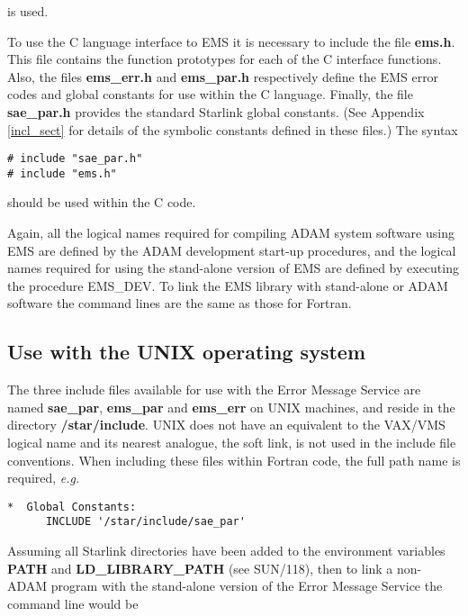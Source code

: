 is used.

To use the C language interface to EMS it is necessary to include the file
{\bf ems.h}.
This file contains the function prototypes for each of the C interface
functions.
Also, the files {\bf ems\_err.h} and {\bf ems\_par.h} respectively define the 
EMS error codes and global constants for use within the C language.
Finally, the file {\bf sae\_par.h} provides the standard Starlink global 
constants.
(See Appendix \ref{incl_sect} for details of the symbolic constants defined in
these files.)
The syntax

\begin{verbatim}
# include "sae_par.h"
# include "ems.h"
\end{verbatim}

should be used within the C code.

Again, all the logical names required for compiling ADAM system software using
EMS are defined by the ADAM development start-up procedures, and the logical
names required for using the stand-alone version of EMS are defined by
executing the procedure EMS\_DEV.
To link the EMS library with stand-alone or ADAM software the command lines
are the same as those for Fortran.


\subsection {Use with the UNIX operating system}

The three include files available for use with the Error Message Service
are named {\bf sae\_par}, {\bf ems\_par} and {\bf ems\_err} on UNIX
machines, and reside in the directory {\bf /star/include}.
UNIX does not have an equivalent to the VAX/VMS logical name and its nearest
analogue, the soft link, is not used in the include file conventions.
When including these files within Fortran code, the full path name is required,
{\em e.g.}

\begin{verbatim}
*  Global Constants:
      INCLUDE '/star/include/sae_par'
\end{verbatim}

\begin {sloppypar}
Assuming all Starlink directories have been added to the environment variables 
{\bf PATH} and {\bf LD\_LIBRARY\_PATH} (see SUN/118), then to link a 
non-ADAM program with the stand-alone version of the 
Error Message Service the command line would be
\end {sloppypar}

